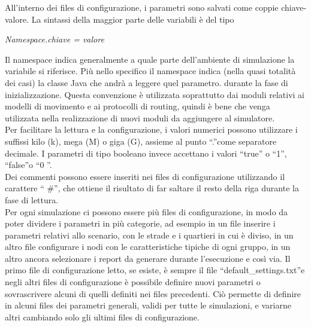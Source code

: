 All'interno dei files di configurazione, i parametri sono salvati come coppie chiave-valore. La sintassi della maggior parte delle variabili è del tipo

\begin{center}
\textit{Namespace.chiave = valore}
\end{center}

Il namespace indica generalmente a quale parte dell'ambiente di simulazione la variabile si riferisce. Più nello specifico il namespace indica (nella quasi totalità dei casi) la classe Java che andrà a leggere quel parametro. durante la fase di inizializzazione. Questa convenzione è utilizzata soprattutto dai moduli relativi ai modelli di movimento e ai protocolli di routing, quindi è bene che venga utilizzata nella realizzazione di nuovi moduli da aggiungere al simulatore.
\\

Per facilitare la lettura e la configurazione, i valori numerici possono utilizzare i suffissi kilo (k), mega (M) o giga (G), assieme al punto \textquotedblleft .\textquotedblright come separatore decimale. I parametri di tipo booleano invece accettano i valori \textquotedblleft true\textquotedblright
 o \textquotedblleft 1\textquotedblright , \textquotedblleft false\textquotedblright o \textquotedblleft 0 \textquotedblright .
 \\
Dei commenti possono essere inseriti nei files di configurazione utilizzando il carattere \textquotedblleft
\#\textquotedblright, che ottiene il risultato di far saltare il resto della riga durante la fase di lettura.
\\

Per ogni simulazione ci possono essere più files di configurazione, in modo da poter dividere i parametri in più categorie, ad esempio in un file inserire i parametri relativi allo scenario, con le strade e i quartieri in cui è diviso, in un altro file configurare i nodi con le caratteristiche tipiche di ogni gruppo, in un altro ancora selezionare i report da generare durante l'esecuzione e così via. Il primo file di configurazione letto, se esiste, è sempre il file \textquotedblleft default\_settings.txt\textquotedblright e negli altri files di configurazione è possibile definire nuovi parametri o sovrascrivere alcuni di quelli definiti nei files precedenti. Ciò permette di definire in alcuni files dei parametri generali, validi per tutte le simulazioni, e variarne altri cambiando solo gli ultimi files di configurazione.
\\

